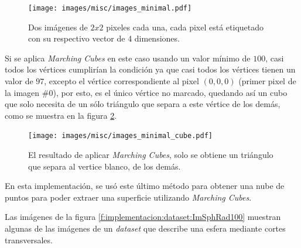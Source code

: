 \begin{figure}[!hbt]
	\centering
	\texttt{[image: images/misc/images\_minimal.pdf]}
	\caption{Dos imágenes de $2x2$ pixeles cada una, cada pixel está etiquetado con su respectivo vector de 4 dimensiones.}
	\label{f:implementacion:images_minimal}
\end{figure}

Si se aplica \emph{Marching Cubes} en este caso usando un valor mínimo de $100$, casi todos los vértices cumplirían la condición ya que casi todos los vértices tienen un valor de $97$, excepto el vértice correspondiente al pixel $(0,0,0)$ (primer pixel de la imagen \#0), por esto, es el único vértice no marcado, quedando así un cubo que solo necesita de un sólo triángulo que separa a este vértice de los demás, como se muestra en la figura \ref{f:implementacion:images_minimal_cube}.

\begin{figure}[!hbt]
	\centering
	\texttt{[image: images/misc/images\_minimal\_cube.pdf]}
	\caption{El resultado de aplicar \emph{Marching Cubes}, solo se obtiene un triángulo que separa al vertice blanco, de los demás.}
	\label{f:implementacion:images_minimal_cube}
\end{figure}

\pagebreak
En esta implementación, se usó este último método para obtener una nube de puntos para poder extraer una superficie utilizando \emph{Marching Cubes}.

Las imágenes de la figura \ref{f:implementacion:dataset:ImSphRad100} muestran algunas de las imágenes de un \emph{dataset} que describe una esfera mediante cortes transversales.

